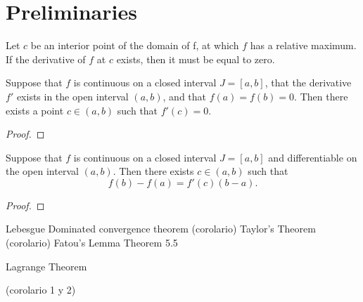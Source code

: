 \section{Preliminaries} \label{Chap1-Sect1} 



\begin{theorem}
    Let $c$ be an interior point of the domain of f, at which $f$ has a relative 
    maximum. If the derivative of $f$ at $c$ exists, then it must be equal to zero.
    
\end{theorem}
\begin{theorem}
    Suppose that $f$ is continuous on a closed interval $J = [a,b]$, that the 
    derivative $f'$ exists in the open interval $(a,b)$, and that 
    $f(a) = f(b) = 0$. Then there exists a point $c \in (a,b)$ such that 
    $f'(c) = 0$.
\end{theorem}
\begin{proof}

\end{proof}
\begin{theorem}
	Suppose that $f$ is continuous on a closed interval $J = [a,b]$ and 
	differentiable on the open interval $(a,b)$. Then there exists $c \in (a,b)$ 
	such that 
	$$
	    f(b) - f(a) = f'(c)(b - a).
	$$
\end{theorem}
\begin{proof}

\end{proof}


Lebesgue Dominated convergence theorem
(corolario)
Taylor's Theorem
(corolario)
Fatou's Lemma
Theorem 5.5

Lagrange Theorem

(corolario 1 y 2)

